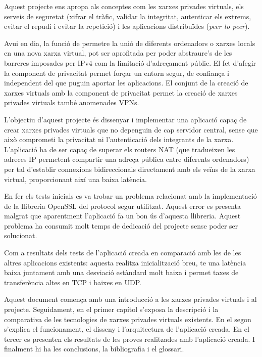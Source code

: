 \portada

\begin{resum}{3.7cm}
Aquest projecte ens apropa als conceptes com les xarxes privades virtuals, els serveis de seguretat (xifrar el tràfic, validar la integritat, autenticar els extrems, evitar el repudi i evitar la repetició) i les aplicacions distribuïdes (\emph{peer to peer}).

Avui en dia, la funció de permetre la unió de diferents ordenadors o xarxes locals en una nova xarxa virtual, pot ser aprofitada per poder abstraure's de les barreres imposades per IPv4 com la limitació d'adreçament públic. El fet d'afegir la component de privacitat permet forçar un entorn segur, de confiança i independent del que puguin aportar les aplicacions. El conjunt de la creació de xarxes virtuals amb la component de privacitat permet la creació de xarxes privades virtuals també anomenades VPNs.

L'objectiu d'aquest projecte és dissenyar i implementar una aplicació capaç de crear xarxes privades virtuals que no depenguin de cap servidor central, sense que això comprometi la privacitat ni l'autenticació dels integrants de la xarxa. L'aplicació ha de ser capaç de superar els routers NAT (que tradueixen les adreces IP permetent compartir una adreça pública entre diferents ordenadors) per tal d'establir connexions bidireccionals directament amb els veïns de la xarxa virtual, proporcionant així una baixa latència.

En fer els tests inicials es va trobar un problema relacionat amb la implementació de la llibreria OpenSSL del protocol segur utilitzat. Aquest error es presenta malgrat que aparentment l'aplicació fa un bon ús d'aquesta llibreria. Aquest problema ha consumit molt temps de dedicació del projecte sense poder ser solucionat.

Com a resultats dels tests de l'aplicació creada en comparació amb les de les altres aplicacions existents: aquesta realitza inicialització breu, te una latència baixa juntament amb una desviació estàndard molt baixa i permet taxes de transferència altes en TCP i baixes en UDP.

Aquest document comença amb una introducció a les xarxes privades virtuals i al projecte.
Seguidament, en el primer capítol s'exposa la descripció i la comparativa de les tecnologies de xarxes privades virtuals existents.
En el segon s'explica el funcionament, el disseny i l'arquitectura de l'aplicació creada.
En el tercer es presenten els resultats de les proves realitzades amb l'aplicació creada.
I finalment hi ha les conclusions, la bibliografia i el glossari.
\end{resum}


